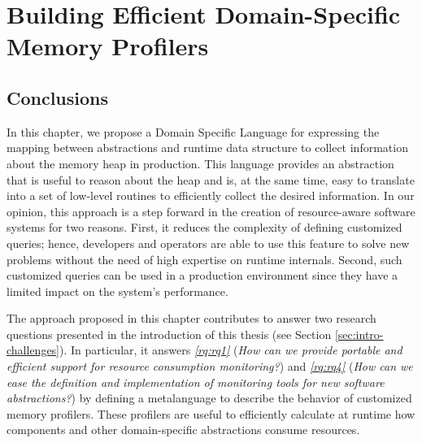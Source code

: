 \chapter{Building Efficient Domain-Specific Memory Profilers}
\label{chp:dsl-memory}














\section{ Conclusions } \label{sec:conclusions}

In this chapter, we propose a Domain Specific Language for expressing the mapping between abstractions and runtime data structure to collect information about the memory heap in production.
This language provides an abstraction that is useful to reason about the heap and is, at the same time, easy to translate into a set of low-level routines to efficiently collect the desired information.
In our opinion, this approach is a step forward in the creation of resource-aware software systems for two reasons. 
First, it reduces the complexity of defining customized queries; hence, developers and operators are able to use this feature to solve new problems without the need of high expertise on runtime internals.
Second, such customized queries can be used in a production environment since they have a limited impact on the system's performance.

The approach proposed in this chapter contributes to answer two research questions presented in the introduction of this thesis (see Section \ref{sec:intro-challenges}).
In particular, it answers \textit{\ref{rq:rq1}} (\textit{How can we provide portable and efficient support for resource consumption monitoring?}) and \textit{\ref{rq:rq4}} (\textit{How can we ease the definition and implementation of monitoring tools for new software abstractions?}) by defining a metalanguage to describe the behavior of customized memory profilers.
These profilers are useful to efficiently calculate at runtime how components and other domain-specific abstractions consume resources. 
